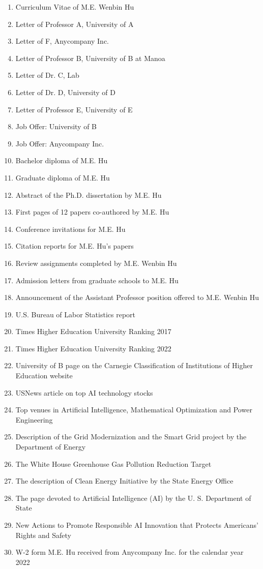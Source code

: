 \documentclass{article}
\begin{document}
\begin{enumerate}[label={Exhibit \arabic*:}]
    \item Curriculum Vitae of M.E. Wenbin Hu 
    \item Letter of Professor A, University of A 
    \item Letter of F, Anycompany Inc. 
    \item Letter of Professor B, University of B at Manoa 
    \item Letter of Dr. C, Lab 
    \item Letter of Dr. D, University of D 
    \item Letter of Professor E, University of E
    \item Job Offer: University of B
    \item Job Offer: Anycompany Inc.
    \item Bachelor diploma of M.E. Hu 
    \item Graduate diploma of M.E. Hu 
    \item Abstract of the Ph.D. dissertation by M.E. Hu 
    \item First pages of 12 papers co-authored by M.E. Hu 
    \item Conference invitations for M.E. Hu 
    \item Citation reports for M.E. Hu’s papers 
    \item Review assignments completed by M.E. Wenbin Hu 
    \item Admission letters from graduate schools to M.E. Hu 
    \item Announcement of the Assistant Professor position offered to M.E. Wenbin Hu 
    \item U.S. Bureau of Labor Statistics report 
    \item Times Higher Education University Ranking 2017 
    \item Times Higher Education University Ranking 2022 
    \item University of B page on the Carnegie Classification of Institutions of Higher Education website 
    \item USNews article on top AI technology stocks 
    \item Top venues in Artificial Intelligence, Mathematical Optimization and Power Engineering 
    \item Description of the Grid Modernization and the Smart Grid project by the Department of Energy 
    \item The White House Greenhouse Gas Pollution Reduction Target 
    \item The description of Clean Energy Initiative by the State Energy Office 
    \item The page devoted to Artificial Intelligence (AI) by the U. S. Department of State
    \item New Actions to Promote Responsible AI Innovation that Protects Americans’ Rights and Safety 
    \item W-2 form M.E. Hu received from Anycompany Inc. for the calendar year 2022
\end{enumerate}
\end{document}
